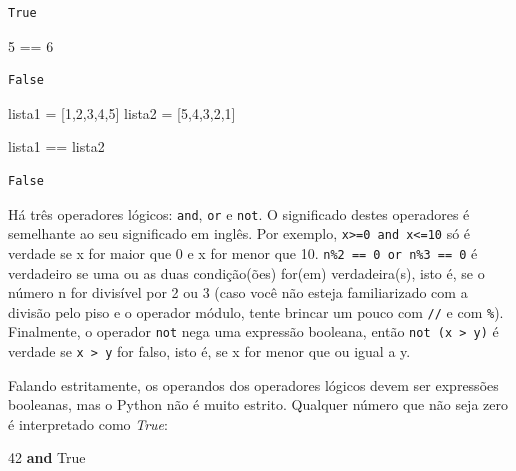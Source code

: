 \documentclass[
  brazilian,
  letterpaper,
  DIV=11,
  numbers=noendperiod]{scrreprt}
\newenvironment{Shaded}{\begin{snugshade}}{\end{snugshade}}
\newcommand{\DecValTok}[1]{\textcolor[rgb]{0.68,0.00,0.00}{#1}}
\newcommand{\KeywordTok}[1]{\textcolor[rgb]{0.00,0.23,0.31}{\textbf{#1}}}
\newcommand{\NormalTok}[1]{\textcolor[rgb]{0.00,0.23,0.31}{#1}}
\newcommand{\OperatorTok}[1]{\textcolor[rgb]{0.37,0.37,0.37}{#1}}
\newcommand{\VariableTok}[1]{\textcolor[rgb]{0.07,0.07,0.07}{#1}}
\begin{document}
\begin{verbatim}
True
\end{verbatim}

\begin{Shaded}
\begin{Highlighting}[]
\DecValTok{5} \OperatorTok{==} \DecValTok{6}
\end{Highlighting}
\end{Shaded}

\begin{verbatim}
False
\end{verbatim}

\begin{Shaded}
\begin{Highlighting}[]
\NormalTok{lista1 }\OperatorTok{=}\NormalTok{ [}\DecValTok{1}\NormalTok{,}\DecValTok{2}\NormalTok{,}\DecValTok{3}\NormalTok{,}\DecValTok{4}\NormalTok{,}\DecValTok{5}\NormalTok{]}
\NormalTok{lista2 }\OperatorTok{=}\NormalTok{ [}\DecValTok{5}\NormalTok{,}\DecValTok{4}\NormalTok{,}\DecValTok{3}\NormalTok{,}\DecValTok{2}\NormalTok{,}\DecValTok{1}\NormalTok{]}

\NormalTok{lista1 }\OperatorTok{==}\NormalTok{ lista2}
\end{Highlighting}
\end{Shaded}

\begin{verbatim}
False
\end{verbatim}

Há três operadores lógicos: \texttt{and}, \texttt{or} e \texttt{not}. O
significado destes operadores é semelhante ao seu significado em inglês.
Por exemplo, \texttt{x\textgreater{}=0\ and\ x\textless{}=10} só é
verdade se x for maior que 0 e x for menor que 10.
\texttt{n\%2\ ==\ 0\ or\ n\%3\ ==\ 0} é verdadeiro se uma ou as duas
condição(ões) for(em) verdadeira(s), isto é, se o número n for divisível
por 2 ou 3 (caso você não esteja familiarizado com a divisão pelo piso e
o operador módulo, tente brincar um pouco com \texttt{//} e com
\texttt{\%}). Finalmente, o operador \texttt{not} nega uma expressão
booleana, então \texttt{not\ (x\ \textgreater{}\ y)} é verdade se
\texttt{x\ \textgreater{}\ y} for falso, isto é, se x for menor que ou
igual a y.

Falando estritamente, os operandos dos operadores lógicos devem ser
expressões booleanas, mas o Python não é muito estrito. Qualquer número
que não seja zero é interpretado como \emph{True}:

\begin{Shaded}
\begin{Highlighting}[]
\DecValTok{42} \KeywordTok{and} \VariableTok{True}
\end{Highlighting}
\end{Shaded}
\end{document}
